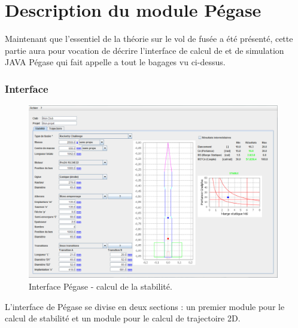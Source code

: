 \documentclass[a4paper]{article}
\begin{document}
\newpage

\part{Description du module Pégase}

Maintenant que l'essentiel de la théorie sur le vol de fusée a été présenté, cette partie aura pour vocation de décrire l'interface de calcul de et de simulation JAVA Pégase qui fait appelle a tout le bagages vu ci-dessus.\\



\section{Interface}


\begin{figure}[!htbp]
\begin{center}
\includegraphics[width=11cm]{pictures/pegase.PNG} 
\end{center}
\caption{Interface Pégase - calcul de la stabilité.}
\label{peg1}
\end{figure}


L'interface de Pégase se divise en deux sections : un premier module pour le calcul de stabilité et un module pour le calcul de trajectoire 2D.
\end{document}
